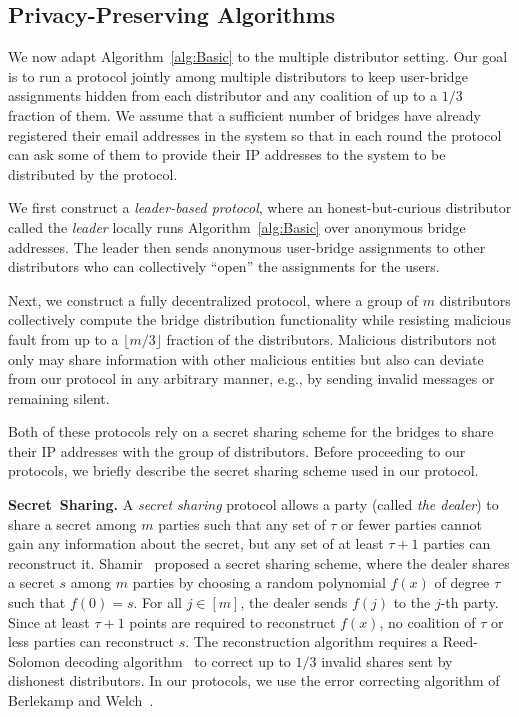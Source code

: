 \documentclass[a4paper,UKenglish]{lipics-v2016}
\newcommand{\eg}{e.g.}
\newcommand{\sfsize}{\fontsize{0.68\baselineskip}{0.68\baselineskip}\selectfont}
\newcommand{\sans}[1]{\textbf{\textsf{\sfsize \mbox{#1}}}}
\newcommand{\para}[1]{\vspace{0.55em} \noindent \sans{{\mbox{#1}}}}
\begin{document}
\subsection{Privacy-Preserving Algorithms} \label{sec:multi-dist}
We now adapt Algorithm~\ref{alg:Basic} to the multiple distributor setting. Our goal is to run a protocol jointly among multiple distributors to keep user-bridge assignments hidden from each distributor and any coalition of up to a $1/3$ 	fraction of them. We assume that a sufficient number of bridges have already registered their email addresses in the system so that in each round the protocol can ask some of them to provide their IP addresses to the system to be distributed by the protocol.

We first construct a \emph{leader-based protocol}, where an honest-but-curious distributor called the \emph{leader} locally runs Algorithm~\ref{alg:Basic} over anonymous bridge addresses. The leader then sends anonymous user-bridge assignments to other distributors who can collectively ``open'' the assignments for the users. 

Next, we construct a fully decentralized protocol, where a group of $m$ distributors collectively compute the bridge distribution functionality while resisting malicious fault from up to a $\lfloor m/3 \rfloor$ fraction of the distributors. Malicious distributors not only may share information with other malicious entities but also can deviate from our protocol in any arbitrary manner, \eg, by sending invalid messages or remaining silent.

Both of these protocols rely on a secret sharing scheme for the bridges to share their IP addresses with the group of distributors. Before proceeding to our protocols, we briefly describe the secret sharing scheme used in our protocol.

\para{Secret Sharing.} A \emph{secret sharing} protocol allows a party (called \emph{the dealer}) to share a secret among $m$ parties such that any set of $\tau$ or fewer parties cannot gain any information about the secret, but any set of at least $\tau+1$ parties can reconstruct it. Shamir~\cite{shamir:how} proposed a secret sharing scheme, where the dealer shares a secret $s$ among $m$ parties by choosing a random polynomial $f(x)$ of degree $\tau$ such that ${f(0)=s}$. For all ${j \in [m]}$, the dealer sends $f(j)$ to the $j$-th party. Since at least ${\tau+1}$ points are required to reconstruct $f(x)$, no coalition of $\tau$ or less parties can reconstruct $s$.
The reconstruction algorithm requires a Reed-Solomon decoding algorithm~\cite{Reed-Solomon1960} to correct up to $1/3$ invalid shares sent by dishonest distributors. In our protocols, we use the error correcting algorithm of Berlekamp and Welch~\cite{Berlekamp:Welch:1986}.
\end{document}
